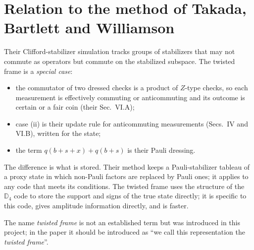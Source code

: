 \documentclass[11pt,a4paper]{article}
\begin{document}
\section{Relation to the method of Takada, Bartlett and Williamson}
Their Clifford-stabilizer simulation tracks groups of stabilizers that may not commute as operators but commute on the stabilized subspace. The twisted frame is a \emph{special case}:
\begin{itemize}
\item the commutator of two dressed checks is a product of $Z$-type checks, so each measurement is effectively commuting or anticommuting and its outcome is certain or a fair coin (their Sec.~VI.A);
\item case (ii) is their update rule for anticommuting measurements (Secs.~IV and VI.B), written for the state;
\item the term $q(b+s+x)+q(b+s)$ is their Pauli dressing.
\end{itemize}
The difference is what is stored. Their method keeps a Pauli-stabilizer tableau of a proxy state in which non-Pauli factors are replaced by Pauli ones; it applies to any code that meets its conditions. The twisted frame uses the structure of the $\mathbb{D}_4$ code to store the support and signs of the true state directly; it is specific to this code, gives amplitude information directly, and is faster.

The name \emph{twisted frame} is not an established term but was introduced in this project; in the paper it should be introduced as ``we call this representation the \emph{twisted frame}''.
\end{document}
